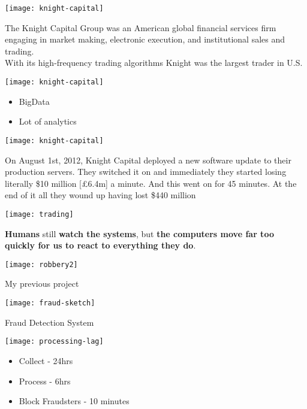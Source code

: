 \documentclass[aspectratio=169, 15pt,usenames,dvipsnames]{beamer}
\begin{document}
\begin{gdsw}
	\centering\texttt{[image: knight-capital]} 
	\par
	The Knight Capital Group was an American global financial services firm engaging in market making, electronic execution, and institutional sales and trading.\\
	With its high-frequency trading algorithms Knight was the largest trader in U.S.        
\end{gdsw}
\begin{gdsw}
	\centering\texttt{[image: knight-capital]} 
	\par
	\begin{itemize}
		\item BigData
		\item Lot of analytics
	\end{itemize}
\end{gdsw}
\begin{gdsw}
	\centering\texttt{[image: knight-capital]} 
	\par
	On August 1st, 2012, Knight Capital deployed a new software update to their production servers.
	They switched it on and immediately they started losing literally \$10 million [£6.4m] a minute.
	And this went on for 45 minutes. At the end of it all they wound up having lost \$440 million
\end{gdsw}	
\begin{gdsw}
	\centering\texttt{[image: trading]} 
	\par
	{\bf Humans} still {\bf watch the systems}, but {\bf the computers move far too quickly for us to react to everything they do}.\\
\end{gdsw}
\begin{gdsw}
	\centering\texttt{[image: robbery2]} 
	\par
	\LARGE My previous project
\end{gdsw}
\begin{gdsw}
	\centering\texttt{[image: fraud-sketch]} 
	\par
	\LARGE Fraud Detection System
\end{gdsw}
\begin{gdsw}
	\centering\texttt{[image: processing-lag]} 
	\par
	\begin{center}		
		\begin{itemize}
			\item Collect - 24hrs
			\item Process - 6hrs
			\item Block Fraudsters - 10 minutes
		\end{itemize}
	\end{center}
\end{gdsw}	
\end{document}
